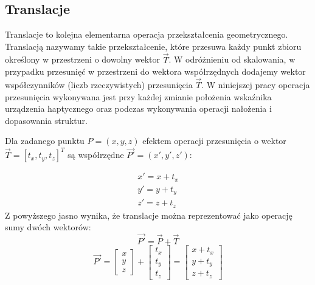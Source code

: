 \documentclass[licencjacka]{pracamgr}
\begin{document}
\subsection{Translacje}
Translacje to kolejna elementarna operacja przekształcenia geometrycznego. Translacją nazywamy takie przekształcenie, które przesuwa każdy punkt zbioru określony w przestrzeni o dowolny wektor $\vec{T}$. W odróżnieniu od skalowania, w przypadku przesunięć w przestrzeni do wektora współrzędnych dodajemy wektor współczynników (liczb rzeczywistych) przesunięcia $\vec{T}$. W niniejszej pracy operacja przesunięcia wykonywana jest przy każdej zmianie położenia wskaźnika urządzenia haptycznego oraz podczas wykonywania operacji nałożenia i dopasowania struktur. 

Dla zadanego punktu $P=(x,y,z)$ efektem operacji przesunięcia o wektor $\vec{T}=[t_x, t_y, t_z]^T$ są współrzędne $\vec{P'}=(x',y',z')$:

$$
\begin{array}{lr}
x'=x+t_x \\
y'=y+t_y \\
z'=z+t_z
\end{array}
$$
Z powyższego jasno wynika, że translacje można reprezentować jako operację sumy dwóch wektorów:
$$
\vec{P'}=\vec{P}+\vec{T}
$$
$$
\vec{P'}
=
\begin{bmatrix}
x \\
y \\
z
\end{bmatrix}
+
\begin{bmatrix}
t_x \\
t_y \\
t_z 
\end{bmatrix}
=
\begin{bmatrix}
x+t_x \\
y+t_y \\
z+t_z 
\end{bmatrix}
$$
\end{document}
